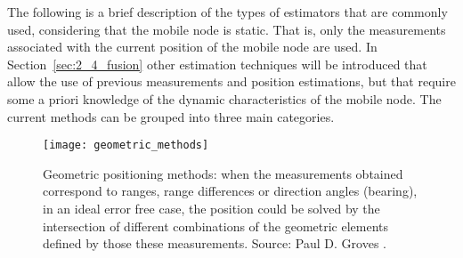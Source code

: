 The following is a brief description of the types of estimators that are commonly used, considering that the mobile node is static. That is, only the measurements associated with the current position of the mobile node are used.
In Section~\ref{sec:2_4_fusion} other estimation techniques will be introduced that allow the use of previous measurements and position estimations, but that require some a priori knowledge of the dynamic characteristics of the mobile node.
The current methods can be grouped into three main categories.
\begin{figure}[!t]
    \centering
	\texttt{[image: geometric\_methods]}    	
	\caption[Geometric positioning methods]{Geometric positioning methods: when the measurements obtained correspond to ranges, range differences or direction angles (bearing), in an ideal error free case, the position could be solved by the intersection of different combinations of the geometric elements defined by those these measurements. Source: Paul D. Groves \cite{groves_principles_2008}.}
	\label{fig:geometric}
\end{figure}
